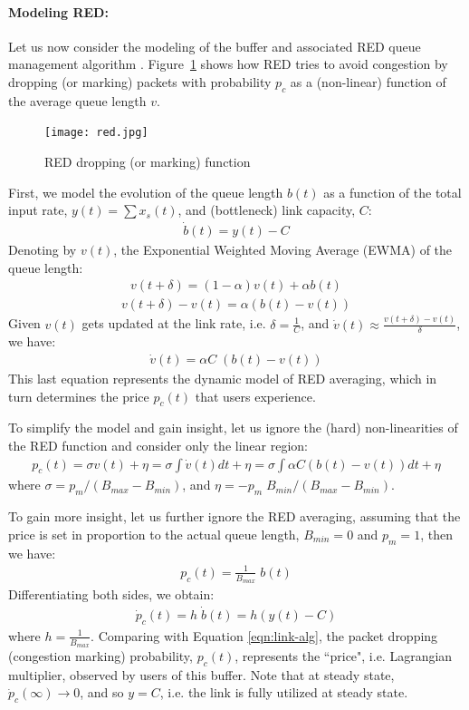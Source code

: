 \documentclass{article}
\begin{document}
\paragraph{Modeling RED:}
Let us now consider the modeling of the buffer and associated RED queue management algorithm \cite{red:1993}.
Figure~\ref{fig:red} shows how RED tries to avoid congestion by dropping (or marking) packets with probability $p_c$ 
as a (non-linear) function of the average queue length $v$.
\begin{figure}[htbp]
   \centering
   \texttt{[image: red.jpg]} %
   \caption{RED dropping (or marking) function}
   \label{fig:red}
\end{figure}
First, we model the evolution of the queue length $b(t)$ as 
a function of the total input rate, $y(t) = \sum x_s(t)$, and (bottleneck) link capacity, $C$:
\begin{eqnarray*}
\dot{b}(t) =  y(t) - C
\end{eqnarray*}
Denoting by $v(t)$, the Exponential Weighted Moving Average (EWMA) of the queue length:
\begin{eqnarray*}
v(t+\delta) = (1 - \alpha) v(t) + \alpha b(t)
\end{eqnarray*}
\begin{eqnarray*}
v(t+\delta) - v(t) = \alpha (b(t) - v(t))
\end{eqnarray*}
Given $v(t)$ gets updated at the link rate, i.e. $\delta = \frac{1}{C}$,
and $\dot{v}(t) \approx \frac{v(t+\delta) - v(t)}{\delta}$, we have:
\begin{eqnarray*}
\dot{v}(t) = \alpha C \; (b(t) - v(t))
\end{eqnarray*}
This last equation represents the dynamic model of RED averaging, which in turn determines the price $p_c(t)$ that users experience. 

To simplify the model and gain insight, let us ignore the (hard) non-linearities of the RED function
and consider only the linear region:
\begin{eqnarray*}
p_c(t) = \sigma v(t) + \eta = \sigma \int \dot{v}(t) dt + \eta = \sigma \int \alpha C(b(t) - v(t)) dt + \eta
\end{eqnarray*}
where $\sigma = p_m/(B_{max}-B_{min})$, and $\eta= -p_m\;B_{min}/(B_{max}-B_{min})$.

To gain more insight, let us further ignore the RED averaging, 
assuming that the price is set in proportion to the actual queue length,
$B_{min}=0$ and $p_m = 1$, then we have:
\begin{eqnarray*}
p_c(t) = \frac{1}{B_{max}} \; b(t)
\end{eqnarray*}
Differentiating both sides, we obtain:
\begin{eqnarray*}
\dot{p}_c(t) = h \; \dot{b}(t) = h(y(t) - C)
\end{eqnarray*}
where $h = \frac{1}{B_{max}}$.
Comparing with Equation \ref{eqn:link-alg}, 
the packet dropping (congestion marking) probability, $p_c(t)$,
represents the ``price", i.e. Lagrangian multiplier, observed by users of this buffer.
Note that at steady state, $\dot{p}_c(\infty) \rightarrow 0$,
and so $y=C$, i.e. the link is fully utilized at steady state.
\end{document}
